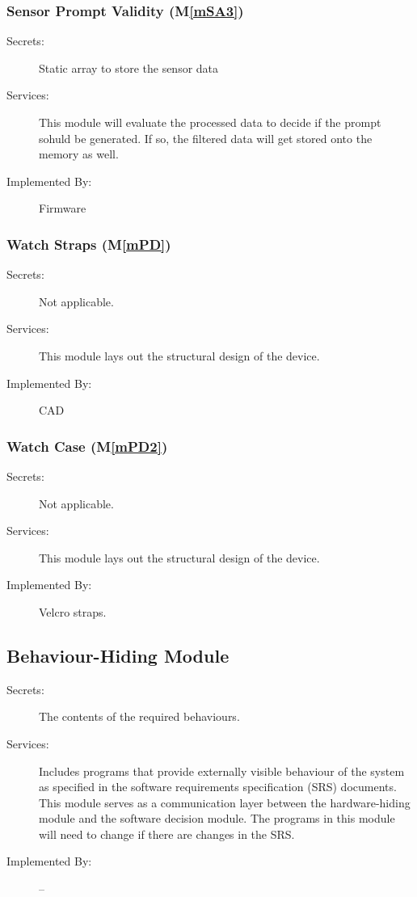 \documentclass[12pt, titlepage]{article}
\newcommand{\mref}[1]{M\ref{#1}}
\begin{document}
\subsubsection{Sensor Prompt Validity (\mref{mSA3})}
\begin{description}
  \item[Secrets:] Static array to store the sensor data
  \item[Services:] This module will evaluate the processed data to decide if the prompt sohuld be generated. If so, the filtered data will get stored onto the memory as well.
  \item[Implemented By:] Firmware
\end{description}

\subsubsection{Watch Straps (\mref{mPD})}
\begin{description}
  \item[Secrets:] Not applicable.
  \item[Services:] This module lays out the structural design of the device.
  \item[Implemented By:] CAD
\end{description}

\subsubsection{Watch Case (\mref{mPD2})}
\begin{description}
  \item[Secrets:] Not applicable.
  \item[Services:] This module lays out the structural design of the device.
  \item[Implemented By:] Velcro straps.
\end{description}

\subsection{Behaviour-Hiding Module}

\begin{description}
  \item[Secrets:]The contents of the required behaviours.
  \item[Services:]Includes programs that provide externally visible behaviour of
  the system as specified in the software requirements specification (SRS)
  documents. This module serves as a communication layer between the
  hardware-hiding module and the software decision module. The programs in this
  module will need to change if there are changes in the SRS.
  \item[Implemented By:] --
\end{description}
\end{document}
